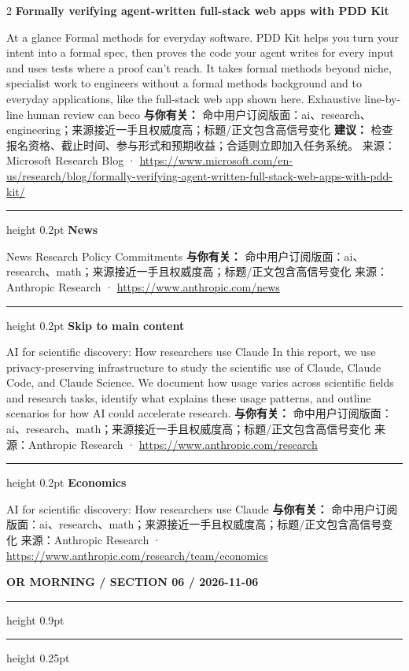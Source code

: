 \documentclass[10.5pt]{ctexart}
\begin{document}
\begin{multicols}{2}
{\large\bfseries Formally verifying agent-written full-stack web apps with PDD Kit}\par
At a glance Formal methods for everyday software. PDD Kit helps you turn your intent into a formal spec, then proves the code your agent writes for every input and uses tests where a proof can’t reach. It takes formal methods beyond niche, specialist work to engineers without a formal methods background and to everyday applications, like the full-stack web app shown here. Exhaustive line-by-line human review can beco
\textbf{与你有关：} 命中用户订阅版面：ai、research、engineering；来源接近一手且权威度高；标题/正文包含高信号变化
\textbf{建议：} 检查报名资格、截止时间、参与形式和预期收益；合适则立即加入任务系统。
{\footnotesize\color{ormuted} 来源：Microsoft Research Blog · \url{https://www.microsoft.com/en-us/research/blog/formally-verifying-agent-written-full-stack-web-apps-with-pdd-kit/}}
\vspace{2mm}
\hrule height 0.2pt
\vspace{2mm}
{\large\bfseries News}\par
News Research Policy Commitments
\textbf{与你有关：} 命中用户订阅版面：ai、research、math；来源接近一手且权威度高；标题/正文包含高信号变化
{\footnotesize\color{ormuted} 来源：Anthropic Research · \url{https://www.anthropic.com/news}}
\vspace{2mm}
\hrule height 0.2pt
\vspace{2mm}
{\large\bfseries Skip to main content}\par
AI for scientific discovery: How researchers use Claude In this report, we use privacy-preserving infrastructure to study the scientific use of Claude, Claude Code, and Claude Science. We document how usage varies across scientific fields and research tasks, identify what explains these usage patterns, and outline scenarios for how AI could accelerate research.
\textbf{与你有关：} 命中用户订阅版面：ai、research、math；来源接近一手且权威度高；标题/正文包含高信号变化
{\footnotesize\color{ormuted} 来源：Anthropic Research · \url{https://www.anthropic.com/research}}
\vspace{2mm}
\hrule height 0.2pt
\vspace{2mm}
{\large\bfseries Economics}\par
AI for scientific discovery: How researchers use Claude
\textbf{与你有关：} 命中用户订阅版面：ai、research、math；来源接近一手且权威度高；标题/正文包含高信号变化
{\footnotesize\color{ormuted} 来源：Anthropic Research · \url{https://www.anthropic.com/research/team/economics}}
\end{multicols}
\newpage
{\small\bfseries OR MORNING / SECTION 06 / 2026-11-06}
\vspace{2mm}
\hrule height 0.9pt
\vspace{1.5mm}
\hrule height 0.25pt
\vspace{4mm}
\end{document}
